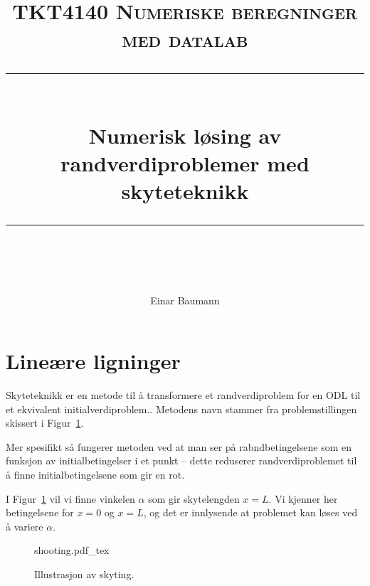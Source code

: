 


\usepackage{url}
\usepackage{etex}
\usepackage{tikz,pgfplots}
\pgfplotsset{compat=1.9}

\usepackage{import}


\author{Einar Baumann}
\title{
    \vspace{-1in}
    \normalfont \normalsize \textsc{TKT4140 Numeriske beregninger med datalab} \\ [20pt]
    \vspace{0.1in}
    \rule{\textwidth}{0.5pt} \\[1cm]
    {\sffamily \huge Numerisk løsing av randverdiproblemer med skyteteknikk} \\
    \vspace{0.1in}
    \rule{\textwidth}{2pt} \\[0.7cm]
}


\maketitle
\thispagestyle{empty}
\clearpage

\section{Lineære ligninger} %
\label{sec:line_re_ligninger}
Skyteteknikk er en metode til å transformere et randverdiproblem for en ODL til et ekvivalent initialverdiproblem.\cite{komp}. Metodens navn stammer fra problemstillingen skissert i Figur~\ref{fig:skyting}.

Mer spesifikt så fungerer metoden ved at man ser på rabndbetingelsene som en funksjon av initialbetingelser i et punkt -- dette reduserer randverdiproblemet til å finne initialbetingelsene som gir en rot.

I Figur~\ref{fig:skyting} vil vi finne vinkelen $\alpha$ som gir skytelengden $x=L$. Vi kjenner her betingelsene for $x=0$ og $x=L$, og det er innlysende at problemet kan løses ved å variere $\alpha$.

\begin{figure}[htbp]
  \centering
  {shooting.pdf_tex}
  \caption{Illustrasjon av skyting.}
  \label{fig:skyting}
\end{figure}

